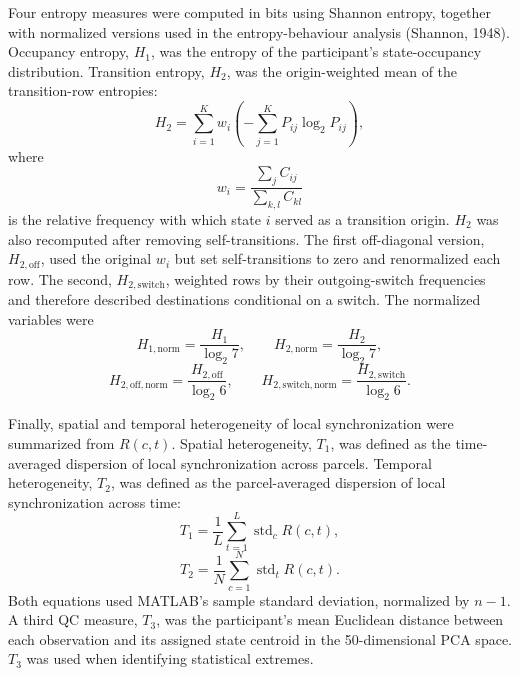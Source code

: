 \documentclass[12pt,a4paper]{report}
\begin{document}
Four entropy measures were computed in bits using Shannon entropy, together with normalized versions used in the entropy-behaviour analysis (Shannon, 1948). Occupancy entropy, $H_1$, was the entropy of the participant's state-occupancy distribution. Transition entropy, $H_2$, was the origin-weighted mean of the transition-row entropies:
\begin{equation}
H_2
=
\sum_{i=1}^{K}
w_i
\left(
-
\sum_{j=1}^{K}
P_{ij}\log_2 P_{ij}
\right),
\end{equation}
where
\begin{equation}
w_i=\frac{\sum_j C_{ij}}{\sum_{k,l}C_{kl}}
\end{equation}
is the relative frequency with which state $i$ served as a transition origin. $H_2$ was also recomputed after removing self-transitions. The first off-diagonal version, $H_{2,\mathrm{off}}$, used the original $w_i$ but set self-transitions to zero and renormalized each row. The second, $H_{2,\mathrm{switch}}$, weighted rows by their outgoing-switch frequencies and therefore described destinations conditional on a switch. The normalized variables were
\begin{equation}
H_{1,\mathrm{norm}}=\frac{H_1}{\log_2 7},
\qquad
H_{2,\mathrm{norm}}=\frac{H_2}{\log_2 7},
\end{equation}
\begin{equation}
H_{2,\mathrm{off,norm}}=\frac{H_{2,\mathrm{off}}}{\log_2 6},
\qquad
H_{2,\mathrm{switch,norm}}=\frac{H_{2,\mathrm{switch}}}{\log_2 6}.
\end{equation}

Finally, spatial and temporal heterogeneity of local synchronization were summarized from $R(c,t)$. Spatial heterogeneity, $T_1$, was defined as the time-averaged dispersion of local synchronization across parcels. Temporal heterogeneity, $T_2$, was defined as the parcel-averaged dispersion of local synchronization across time:
\begin{equation}
T_1
=
\frac{1}{L}
\sum_{t=1}^{L}
\operatorname{std}_c R(c,t),
\end{equation}
\begin{equation}
T_2
=
\frac{1}{N}
\sum_{c=1}^{N}
\operatorname{std}_t R(c,t).
\end{equation}
Both equations used MATLAB's sample standard deviation, normalized by $n-1$. A third QC measure, $T_3$, was the participant's mean Euclidean distance between each observation and its assigned state centroid in the 50-dimensional PCA space. $T_3$ was used when identifying statistical extremes.
\end{document}
